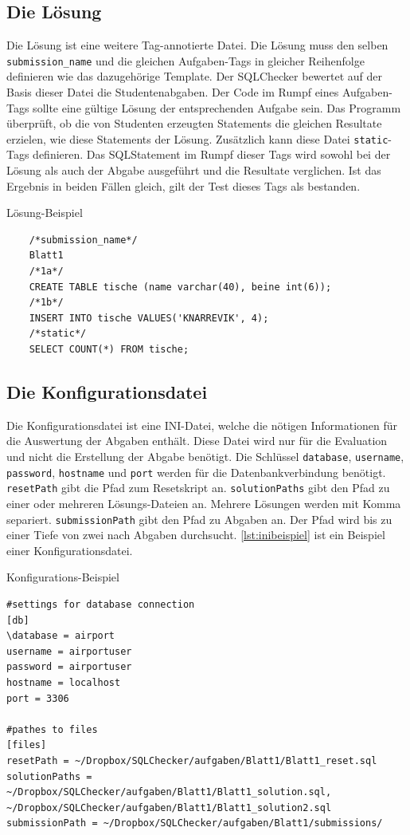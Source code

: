 \documentclass[11pt]{article}
\begin{document}
\subsection{Die Lösung}
Die Lösung ist eine weitere Tag-annotierte Datei. Die Lösung muss den selben \texttt{submission\_name} und die gleichen Aufgaben-Tags in gleicher Reihenfolge definieren wie das dazugehörige Template. Der SQLChecker bewertet auf der Basis dieser Datei die Studentenabgaben. Der Code im Rumpf eines Aufgaben-Tags sollte eine gültige Lösung der entsprechenden Aufgabe sein. Das Programm überprüft, ob die von Studenten erzeugten Statements die gleichen Resultate erzielen, wie diese Statements der Lösung. Zusätzlich kann diese Datei \texttt{static}-Tags definieren. Das SQLStatement im Rumpf dieser Tags wird sowohl bei der Lösung als auch der Abgabe ausgeführt und die Resultate verglichen. Ist das Ergebnis in beiden Fällen gleich, gilt der Test dieses Tags als bestanden.
\begin{listing}
	\caption{Lösung-Beispiel}
	\label{lst:lösungbeispiel}
	\begin{verbatim}
	/*submission_name*/
	Blatt1
	/*1a*/
	CREATE TABLE tische (name varchar(40), beine int(6)); 
	/*1b*/
	INSERT INTO tische VALUES('KNARREVIK', 4);
	/*static*/
	SELECT COUNT(*) FROM tische;
	\end{verbatim}
\end{listing}

\subsection{Die Konfigurationsdatei}
Die Konfigurationsdatei ist eine INI-Datei, welche die nötigen Informationen für die Auswertung der Abgaben enthält. Diese Datei wird nur für die Evaluation und nicht die Erstellung der Abgabe benötigt. Die Schlüssel \texttt{database}, \texttt{username}, \texttt{password}, \texttt{hostname} und \texttt{port} werden für die Datenbankverbindung benötigt. \texttt{resetPath} gibt die Pfad zum Resetskript an. \texttt{solutionPaths} gibt den Pfad zu einer oder mehreren Lösungs-Dateien an. Mehrere Lösungen werden mit Komma separiert. \texttt{submissionPath} gibt den Pfad zu Abgaben an. Der Pfad wird bis zu einer Tiefe von zwei nach Abgaben durchsucht. \ref{lst:inibeispiel} ist ein Beispiel einer Konfigurationsdatei.

\begin{listing}
	\caption{Konfigurations-Beispiel}
	\label{lst:inibeispiel}
	\begin{verbatim}
#settings for database connection
[db]
\database = airport
username = airportuser
password = airportuser
hostname = localhost
port = 3306

#pathes to files
[files]
resetPath = ~/Dropbox/SQLChecker/aufgaben/Blatt1/Blatt1_reset.sql
solutionPaths = ~/Dropbox/SQLChecker/aufgaben/Blatt1/Blatt1_solution.sql, ~/Dropbox/SQLChecker/aufgaben/Blatt1/Blatt1_solution2.sql
submissionPath = ~/Dropbox/SQLChecker/aufgaben/Blatt1/submissions/
	\end{verbatim}
\end{listing}
\end{document}
